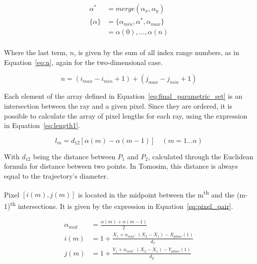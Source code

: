 \begin{equation}
    \label{eq:final_parametric_set}
    \begin{aligned}
        \alpha^* &= merge(\alpha_x, \alpha_y)\\
        \{ \alpha \} &= \{ \alpha_{min}, \alpha^*, \alpha_{max} \}\\
                     &= \alpha(0), \ldots, \alpha(n)\\
    \end{aligned}
\end{equation}

Where the last term, $n$, is given by the sum of all index range
numbers, as in Equation~\ref{eq:n}, again for the two-dimensional case.

\begin{equation}
    \label{eq:n}
    n = (i_{max} - i_{min} + 1) + (j_{max} - j_{min} + 1)
\end{equation}

Each element of the array defined in
Equation~\ref{eq:final_parametric_set} is an intersection between the
ray and a given pixel. Since they are ordered, it is possible to
calculate the array of pixel lengths for each ray, using the expression
in Equation~\ref{eq:length1}.

\begin{equation}
    \label{eq:length1}
    l_{m} = d_{12}[ \alpha(m) - \alpha(m-1)] \quad (m = 1 \ldots n)
\end{equation}

With $d_{12}$ being the distance between $P_1$ and $P_2$, calculated
through the Euclidean formula for distance between two points. In
Tomosim, this distance is always equal to the trajectory's diameter.

Pixel $[i(m), j(m)]$ is located in the midpoint between the
m\textsuperscript{th} and the (m-1)\textsuperscript{th} intersections.
It is given by the expression in Equation~\ref{eq:pixel_pair}.

\begin{equation}
    \label{eq:pixel_pair}
    \begin{aligned}
        \alpha_{mid} &= \frac{\alpha(m) + \alpha(m-1)}{2}\\
        i(m) &= 1 + \frac{X_1 + \alpha_{mid}\cdot(X_2 - X_1) -
            X_{plane}(1)}{d_x}\\
        j(m) &= 1 + \frac{Y_1 + \alpha_{mid}\cdot(X_2 - X_1) -
            Y_{plane}(1)}{d_y}\\
    \end{aligned}
\end{equation}

